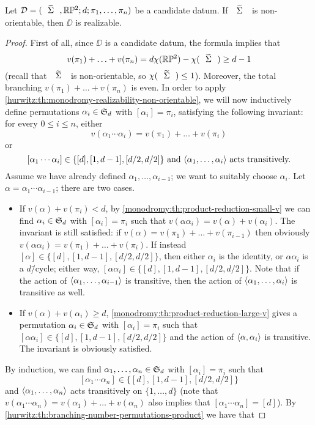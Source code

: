 \begin{theorem}\label{monodromy:th:realizability-projective-plane}
Let $\DD=\datum{\tSigma,\RP[2]}{d}{\pi_1,\ldots,\pi_n}$ be a candidate datum. If $\tSigma$ is non-orientable, then $\DD$ is realizable.
\end{theorem}
\begin{proof}
First of all, since $\DD$ is a candidate datum, the \RH{} formula implies that
\[
v(\pi_1)+\ldots+v(\pi_n)=d\chi(\RP[2])-\chi(\tSigma)\ge d-1
\]
(recall that $\tSigma$ is non-orientable, so $\chi(\tSigma)\le 1$). Moreover, the total branching $v(\pi_1)+\ldots+v(\pi_n)$ is even. In order to apply \cref{hurwitz:th:monodromy-realizability-non-orientable}, we will now inductively define permutations $\alpha_i\in\symgroup[d]$ with $[\alpha_i]=\pi_i$, satisfying the following invariant: for every $0\le i\le n$, either
\[
v(\alpha_1\cdots\alpha_i)=v(\pi_1)+\ldots+v(\pi_i)
\]
or
\[
\text{$[\alpha_1\cdots\alpha_i]\in\{[d],[1,d-1],[d/2,d/2]\}$ and $\left\langle\alpha_1,\ldots,\alpha_i\right\rangle$ acts transitively.}
\]
Assume we have already defined $\alpha_1,\ldots,\alpha_{i-1}$; we want to suitably choose $\alpha_i$. Let $\alpha=\alpha_1\cdots\alpha_{i-1}$; there are two cases.
\begin{itemize}
\item If $v(\alpha)+v(\pi_i)<d$, by \cref{monodromy:th:product-reduction-small-v} we can find $\alpha_i\in\symgroup[d]$ with $[\alpha_i]=\pi_i$ such that $v(\alpha\alpha_i)=v(\alpha)+v(\alpha_i)$. The invariant is still satisfied: if $v(\alpha)=v(\pi_1)+\ldots+v(\pi_{i-1})$ then obviously $v(\alpha\alpha_i)=v(\pi_1)+\ldots+v(\pi_i)$. If instead $[\alpha]\in\{[d],[1,d-1],[d/2,d/2]\}$, then either $\alpha_i$ is the identity, or $\alpha\alpha_i$ is a $d$\=/cycle; either way, $[\alpha\alpha_i]\in\{[d],[1,d-1],[d/2,d/2]\}$. Note that if the action of $\left\langle\alpha_1,\ldots,\alpha_{i-1}\right\rangle$ is transitive, then the action of $\left\langle\alpha_1,\ldots,\alpha_i\right\rangle$ is transitive as well.
\item If $v(\alpha)+v(\alpha_i)\ge d$, \cref{monodromy:th:product-reduction-large-v} gives a permutation $\alpha_i\in\symgroup[d]$ with $[\alpha_i]=\pi_i$ such that $[\alpha\alpha_i]\in\{[d],[1,d-1],[d/2,d/2]\}$ and the action of $\left\langle\alpha,\alpha_i\right\rangle$ is transitive. The invariant is obviously satisfied.
\end{itemize}
By induction, we can find $\alpha_1,\ldots,\alpha_n\in\symgroup[d]$ with $[\alpha_i]=\pi_i$ such that
\[
[\alpha_1\cdots\alpha_n]\in\{[d],[1,d-1],[d/2,d/2]\}
\]
and $\left\langle\alpha_1,\ldots,\alpha_n\right\rangle$ acts transitively on $\{1,\ldots,d\}$ (note that $v(\alpha_1\cdots\alpha_n)=v(\alpha_1)+\ldots+v(\alpha_n)$ also implies that $[\alpha_1\cdots\alpha_n]=[d]$). By \cref{hurwitz:th:branching-number-permutations-product} we have that

\end{proof}
